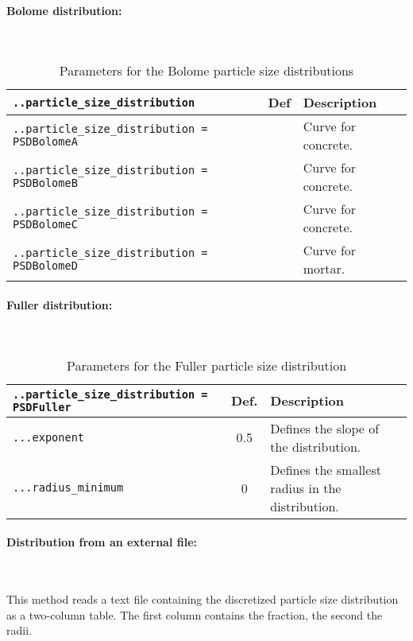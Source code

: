 \documentclass[10pt]{article}
\newcommand{\whiteline}{\textcolor{white}{.\\}}
\begin{document}
\paragraph{Bolome distribution:} \whiteline

\begin{table}[h!]
\begin{tabularx}{\textwidth}{lcX}
\verb+..particle_size_distribution+ & Def & Description \\
\hline
\verb+..particle_size_distribution = PSDBolomeA+ & & Curve for concrete.\\
\verb+..particle_size_distribution = PSDBolomeB+ & & Curve for concrete.\\
\verb+..particle_size_distribution = PSDBolomeC+ & & Curve for concrete.\\
\verb+..particle_size_distribution = PSDBolomeD+ & & Curve for mortar.\\
\hline
\end{tabularx}
\caption{Parameters for the Bolome particle size distributions}
\end{table}

\eject

\paragraph{Fuller distribution:} \whiteline

\begin{table}[h!]
\begin{tabularx}{\textwidth}{lcX}
\verb+..particle_size_distribution = PSDFuller+ & Def. & Description\\
\hline
\verb+...exponent+ & 0.5 & Defines the slope of the distribution. \\
\verb+...radius_minimum+ & 0 & Defines the smallest radius in the distribution. \\
\hline
\end{tabularx}
\caption{Parameters for the Fuller particle size distribution}
\end{table}

\paragraph{Distribution from an external file:} \whiteline

This method reads a text file containing the discretized particle size distribution as a two-column table. 
The first column contains the fraction, the second the radii.
\end{document}
